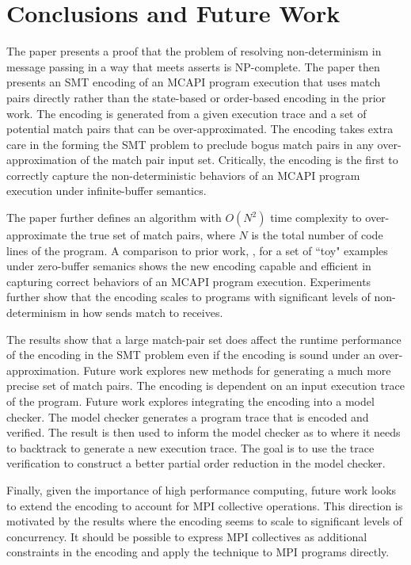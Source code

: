 \section{Conclusions and Future Work}
The paper presents a proof that the problem of resolving
non-determinism in message passing in a way that meets asserts is
NP-complete. The paper then presents an SMT encoding of an MCAPI
program execution that uses match pairs directly rather than the
state-based or order-based encoding in the prior work. The encoding is
generated from a given execution trace and a set of potential match
pairs that can be over-approximated. The encoding takes extra care in
the forming the SMT problem to preclude bogus match pairs in any
over-approximation of the match pair input set. Critically, the
encoding is the first to correctly capture the non-deterministic
behaviors of an MCAPI program execution under infinite-buffer
semantics.

The paper further defines an algorithm with $O(N^2)$ time complexity
to over-approximate the true set of match pairs, where $N$ is the
total number of code lines of the program. A comparison to prior work,
\cite{elwakil:padtad10}, for a set of ``toy" examples under
zero-buffer semanics shows the new encoding capable and efficient in
capturing correct behaviors of an MCAPI program execution. Experiments
further show that the encoding scales to programs with significant levels of
non-determinism in how sends match to receives.

The results show that a large match-pair set does affect the runtime
performance of the encoding in the SMT problem even if the encoding is
sound under an over-approximation. Future work explores new methods
for generating a much more precise set of match pairs. The encoding is
dependent on an input execution trace of the program. Future work
explores integrating the encoding into a model checker. The model
checker generates a program trace that is encoded and verified. The
result is then used to inform the model checker as to where it needs
to backtrack to generate a new execution trace. The goal is to use the
trace verification to construct a better partial order reduction in
the model checker.

Finally, given the importance of high performance computing, future
work looks to extend the encoding to account for MPI collective
operations. This direction is motivated by the results where the
encoding seems to scale to significant levels of concurrency. It
should be possible to express MPI collectives as additional
constraints in the encoding and apply the technique to MPI programs
directly.
